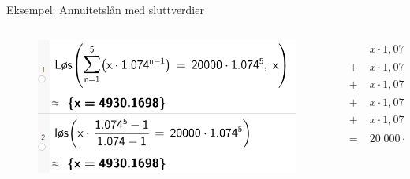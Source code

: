 \greenheader
\begin{frame}[t]{Eksempel: Annuitetslån med sluttverdier}
\begin{center}
\end{center}
\begin{columns}[T,onlytextwidth]
  \begin{column}{0.70\textwidth}
 \begin{figure}
      \centering
      \includegraphics[width=0.8\linewidth]{R2K1E-1.png}
  \end{figure}
  \end{column}
   \begin{column}{0.30\textwidth}
    \begin{align*}
      &x\cdot 1,074^0\\
      +\;&x\cdot 1,074^1\\
      +\;&x\cdot 1,074^2\\
      +\;&x\cdot 1,074^3\\
     +\;&x\cdot 1,074^4\\
      =\;&20\;000\cdot 1.074^5
    \end{align*}
\end{column}
\end{columns}
\end{frame}

